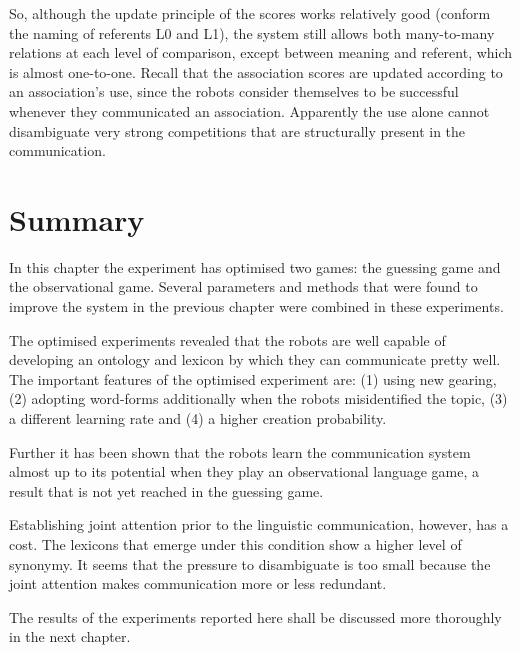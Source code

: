 So, although the update principle of the scores works relatively good (conform the naming of referents L0 and L1), the system still allows both many-to-many relations at each level of comparison, except between meaning and referent, which is almost one-to-one. Recall that the association scores are updated according to an association's use, since the robots consider themselves to be successful whenever they communicated an association. Apparently the use alone cannot disambiguate very strong competitions that are structurally present in the communication. 

\section{Summary}

In this chapter the experiment has optimised two games: the guessing game and the observational game. Several parameters and methods that were found to improve the system in the previous chapter were combined in these experiments.

The optimised experiments revealed that the robots are well capable of developing an ontology and lexicon by which they can communicate pretty well. The important features of the optimised experiment are: (1) using new gearing, (2) adopting word-forms additionally when the robots misidentified the topic, (3) a different learning rate and (4) a higher creation probability. 

Further it has been shown that the robots learn the communication system almost up to its potential when they play an observational language game, a result that is not yet reached in the guessing game. 

Establishing joint attention prior to the linguistic communication, however, has a cost. The lexicons that emerge under this condition show a higher level of synonymy. It seems that the pressure to disambiguate is too small because the joint attention makes communication more or less redundant. 

The results of the experiments reported here shall be discussed more thoroughly in the next chapter.


